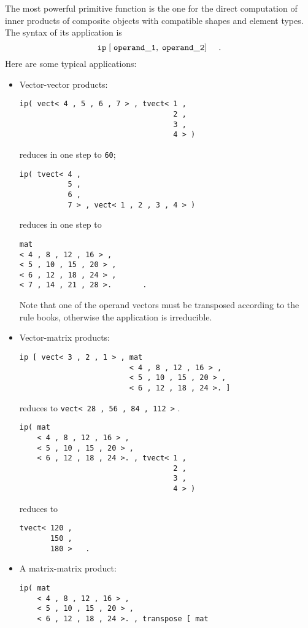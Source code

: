 The most powerful primitive function is the one for the direct computation of {\mys inner products}
of composite objects with compatible shapes and element types. The
syntax of its application is
$$
{\tt ip\;[\;operand\_1,\;operand\_2]}\;\;\;\;\; .
$$
Here are some typical applications:
\begin{itemize}
\item Vector-vector products:
\begin{verbatim}
ip( vect< 4 , 5 , 6 , 7 > , tvect< 1 ,
                                   2 ,
                                   3 ,
                                   4 > )
\end{verbatim}
reduces in one step to {\tt 60};
\begin{verbatim}
ip( tvect< 4 ,
           5 ,
           6 ,
           7 > , vect< 1 , 2 , 3 , 4 > )      
\end{verbatim}
reduces in one step to
\begin{verbatim}
mat 
< 4 , 8 , 12 , 16 > ,
< 5 , 10 , 15 , 20 > ,
< 6 , 12 , 18 , 24 > ,
< 7 , 14 , 21 , 28 >.       .
\end{verbatim}
Note that one of the operand vectors must be transposed
according to the rule books, otherwise the application is
irreducible.
\item Vector-matrix products:
\begin{verbatim}
ip [ vect< 3 , 2 , 1 > , mat 
                         < 4 , 8 , 12 , 16 > ,
                         < 5 , 10 , 15 , 20 > ,
                         < 6 , 12 , 18 , 24 >. ]
\end{verbatim}
reduces to {\tt vect< 28 , 56 , 84 , 112 >} .
\begin{verbatim}
ip( mat 
    < 4 , 8 , 12 , 16 > ,
    < 5 , 10 , 15 , 20 > ,
    < 6 , 12 , 18 , 24 >. , tvect< 1 ,
                                   2 ,
                                   3 ,
                                   4 > )   
\end{verbatim}
reduces to
\begin{verbatim}
tvect< 120 ,
       150 ,
       180 >   .
\end{verbatim}
\item A matrix-matrix product:
\begin{verbatim}
ip( mat 
    < 4 , 8 , 12 , 16 > ,
    < 5 , 10 , 15 , 20 > ,
    < 6 , 12 , 18 , 24 >. , transpose [ mat 

\end{verbatim}
\end{itemize}
